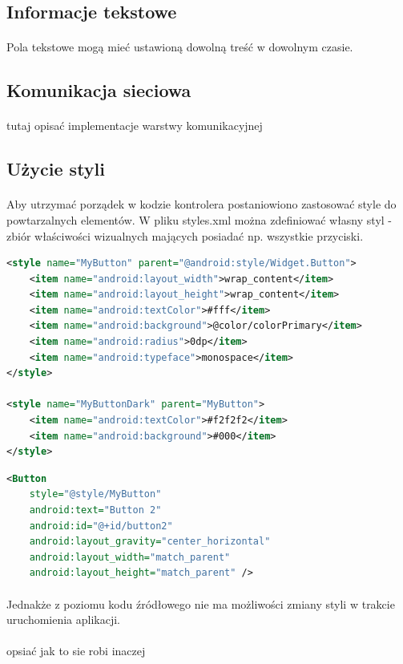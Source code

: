 \subsection{Informacje tekstowe}
\paragraph{}
Pola tekstowe mogą mieć ustawioną dowolną treść w dowolnym czasie.

\subsection{Komunikacja sieciowa}
\paragraph{}
{\color{red}tutaj opisać implementacje warstwy komunikacyjnej}


\subsection{Użycie styli}
\paragraph{}
Aby utrzymać porządek w kodzie kontrolera postaniowiono zastosować style do powtarzalnych elementów. W pliku styles.xml można zdefiniować własny styl - zbiór właściwości wizualnych mających posiadać np. wszystkie przyciski.


\begin{lstlisting}[language=XML]
 <style name="MyButton" parent="@android:style/Widget.Button">
    <item name="android:layout_width">wrap_content</item>
    <item name="android:layout_height">wrap_content</item>
    <item name="android:textColor">#fff</item>
    <item name="android:background">@color/colorPrimary</item>
    <item name="android:radius">0dp</item>
    <item name="android:typeface">monospace</item>
</style>

<style name="MyButtonDark" parent="MyButton">
    <item name="android:textColor">#f2f2f2</item>
    <item name="android:background">#000</item>
</style>
\end{lstlisting}

\begin{lstlisting}[language=XML]
<Button
    style="@style/MyButton"
    android:text="Button 2"
    android:id="@+id/button2"
    android:layout_gravity="center_horizontal"
    android:layout_width="match_parent"
    android:layout_height="match_parent" />
\end{lstlisting}

\paragraph{}
Jednakże z poziomu kodu źródłowego nie ma możliwości zmiany styli w trakcie uruchomienia aplikacji.
\paragraph{}
{\color{red}opsiać jak to sie robi inaczej}
